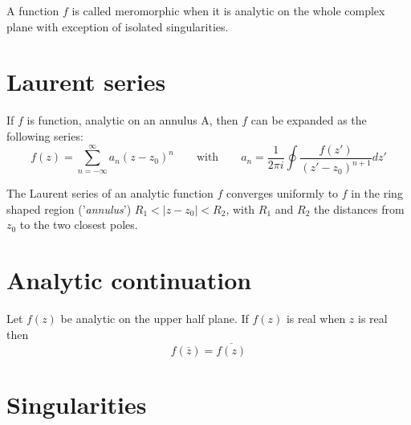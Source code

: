         \begin{definition}[Meromorphic]
			A function $f$ is called meromorphic when it is analytic on the whole complex plane with exception of isolated singularities. 
		\end{definition}
        
\section{Laurent series}
    	\begin{definition}
        	\label{complexcalculus:laurent_series}
            If $f$ is function, analytic on an annulus A, then $f$ can be expanded as the following series:
            \begin{equation}
                f(z) = \sum^{\infty}_{n=-\infty} a_n (z - z_0)^n \qquad \text{with} \qquad a_n = \frac{1}{2\pi i} \oint \frac{f(z')}{(z' - z_0)^{n+1}} dz'
			\end{equation}
		\end{definition}
        
        \begin{remark}
			The Laurent series of an analytic function $f$ converges uniformly to $f$ in the ring shaped region ('\textit{annulus}') $R_1 < |z - z_0| < R_2$, with $R_1$ and $R_2$ the distances from $z_0$ to the two closest poles.
        \end{remark}
        
        
\section{Analytic continuation}
	\begin{theorem}
		Let $f(z)$ be analytic on the upper half plane. If $f(z)$ is real when $z$ is real then
        \begin{equation}
        	f(\overline{z}) = \overline{f(z)}
        \end{equation}
	\end{theorem}
    
\section{Singularities}
